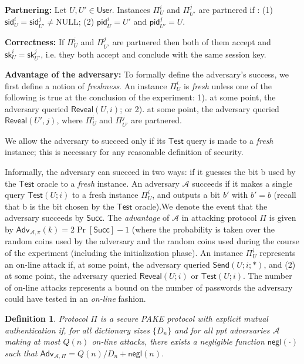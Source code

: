 \documentclass[11pt]{article}
\newcommand{\adv}{\mathcal{A}}
\newcommand{\class}[1]{{\ensuremath{\mathsf{#1}}}}
\newcommand{\negl}{\class{negl}}
\newcommand{\Adv}{\class{Adv}}
\newcommand{\Succ}{\class{Succ}}
\newcommand{\sid}{\class{sid}}
\newcommand{\pid}{\class{pid}}
\newcommand{\sk}{\class{sk}}
\newcommand{\iU}{\ensuremath{\Pi^i_U}}
\newcommand{\jU}{\ensuremath{\Pi^j_{U'}}}
\newtheorem{defn}[thm]{Definition}
\begin{document}
\textbf{Partnering: }Let $U, U' \in \class{User}$. Instances $\Pi^i_U$ and $\Pi^j_{U'}$ are partnered if : (1) $\sid^i_U = \sid^j_{U'} \ne \text{NULL}$; (2) $\pid^i_U = U'$ and $\pid^j_{U'} = U$.

\textbf{Correctness: }If $\Pi^i_U$ and $\Pi^j_{U'}$ are partnered then both of them accept and $\sk^i_U = \sk^j_{U'}$, i.e. they both accept and conclude with the same session key.

\textbf{Advantage of the adversary: }To formally define the adversary's success, we first define a notion of \emph{freshness}. An instance $\iU$ is \emph{fresh} unless one of the following is true at the conclusion of the experiment: 1). at some point, the adversary queried $\class{Reveal}(U, i)$; or 2). at some point, the adversary queried $\class{Reveal}(U', j)$, where $\iU$ and $\jU$ are partnered.

We allow the adversary to succeed only if its $\class{Test}$ query is made to a \emph{fresh} instance; this is necessary for any reasonable definition of security.

Informally, the adversary can succeed in two ways: if it guesses the bit b used by the $\class{Test}$ oracle to a \emph{fresh} instance. 
An adversary $\adv$ succeeds if it makes a single query $\class{Test}(U; i)$ to a fresh instance $\iU$, and outputs a bit $b'$ with $b'= b$ (recall that b is the bit chosen by the $\class{Test}$ oracle).We denote the event that the adversary succeeds by $\class{Succ}$. The \emph{advantage} of $\adv$ in attacking protocol $\Pi$ is given by $\Adv_{\adv, \pi}(k) = 2\Pr[\Succ] - 1$ (where the probability is taken over the random coins used by the adversary and the random coins used
during the course of the experiment (including the initialization phase).
An instance $\iU$ represents an on-line attack if, at some point, the adversary queried $\class{Send}(U; i; *)$, and (2) at some point, the adversary queried $\class{Reveal}(U; i)$ or $\class{Test}(U; i)$. The number of on-line attacks represents a bound on the number of passwords the adversary could have tested in an \emph{on-line} fashion.

\begin{defn}
Protocol $\Pi$ is a secure PAKE protocol with explicit mutual authentication if, for all
dictionary sizes $\{D_n\}$ and for all ppt adversaries $\adv$ making at most $Q(n)$ on-line attacks, there
exists a negligible function $\negl(\cdot)$ such that $\Adv_{\adv,\Pi} = Q(n)/D_n + \negl(n)$.
\end{defn}
 
\end{document}
